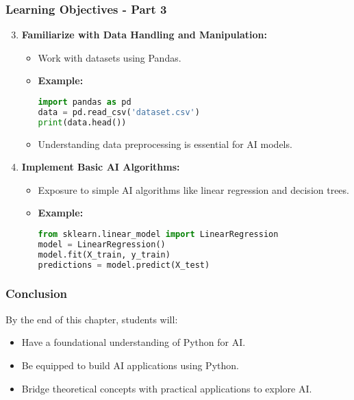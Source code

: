 \documentclass[aspectratio=169]{beamer}
\begin{document}
\begin{frame}[fragile]
    \frametitle{Learning Objectives - Part 3}
    \begin{enumerate}
        \setcounter{enumi}{2} %
        \item \textbf{Familiarize with Data Handling and Manipulation:}
        \begin{itemize}
            \item Work with datasets using Pandas.
            \item \textbf{Example:}
            \begin{lstlisting}[language=Python]
import pandas as pd
data = pd.read_csv('dataset.csv')
print(data.head())
            \end{lstlisting}
            \item Understanding data preprocessing is essential for AI models.
        \end{itemize}
        
        \item \textbf{Implement Basic AI Algorithms:}
        \begin{itemize}
            \item Exposure to simple AI algorithms like linear regression and decision trees.
            \item \textbf{Example:}
            \begin{lstlisting}[language=Python]
from sklearn.linear_model import LinearRegression
model = LinearRegression()
model.fit(X_train, y_train)
predictions = model.predict(X_test)
            \end{lstlisting}
        \end{itemize}
    \end{enumerate}
\end{frame}

\begin{frame}[fragile]
    \frametitle{Conclusion}
    By the end of this chapter, students will:
    \begin{itemize}
        \item Have a foundational understanding of Python for AI.
        \item Be equipped to build AI applications using Python.
        \item Bridge theoretical concepts with practical applications to explore AI.
    \end{itemize}
\end{frame}
\end{document}
